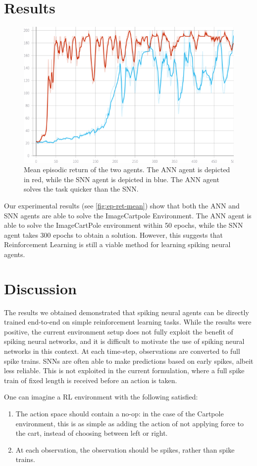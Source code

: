 \documentclass[fyp]{socreport}
\begin{document}
\section{Results}

\begin{figure}
  \centering \includegraphics[width=0.55\columnwidth]{images/ep-ret-mean.png}
  \caption{Mean episodic return of the two agents. The ANN agent is depicted in
    red, while the SNN agent is depicted in blue. The ANN agent solves the task
    quicker than the SNN.\label{fig:ep-ret-mean}}
\end{figure}

Our experimental results (see \autoref{fig:ep-ret-mean}) show that both the ANN
and SNN agents are able to solve the ImageCartpole Environment. The ANN agent is
able to solve the ImageCartPole environment within 50 epochs, while the SNN
agent takes 300 epochs to obtain a solution. However, this suggests that
Reinforcement Learning is still a viable method for learning spiking neural
agents.

\section{Discussion}

The results we obtained demonstrated that spiking neural agents can be directly
trained end-to-end on simple reinforcement learning tasks. While the results
were positive, the current environment setup does not fully exploit the benefit
of spiking neural networks, and it is difficult to motivate the use of spiking
neural networks in this context. At each time-step, observations are converted
to full spike trains. SNNs are often able to make predictions based on early
spikes, albeit less reliable. This is not exploited in the current formulation,
where a full spike train of fixed length is received before an action is taken.

One can imagine a RL environment with the following satisfied:

\begin{enumerate}
  \item The action space should contain a no-op: in the case of the Cartpole
    environment, this is as simple as adding the action of not applying force to
    the cart, instead of choosing between left or right.
  \item At each observation, the observation should be spikes, rather than spike
  trains.
\end{enumerate}
\end{document}
